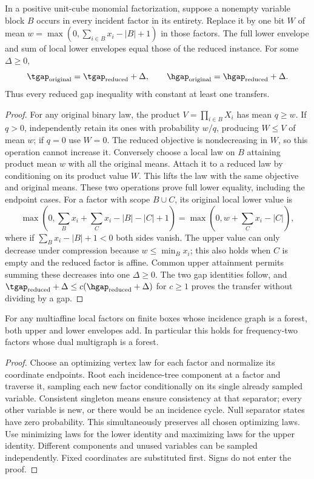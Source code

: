 \begin{lemma}\label{lem:twin-compression}
In a positive unit-cube monomial factorization, suppose a nonempty
variable block $B$ occurs in every incident factor in its entirety.
Replace it by one bit $W$ of mean
$w=\max(0,\sum_{i\in B}x_i-|B|+1)$ in those factors.
The full lower envelope and sum of local lower envelopes equal those
of the reduced instance. For some $\Delta\ge0$,
\[
 \tgap_{\rm original}=\tgap_{\rm reduced}+\Delta,\qquad
 \hgap_{\rm original}=\hgap_{\rm reduced}+\Delta.
\]
Thus every reduced gap inequality with constant at least one transfers.
\end{lemma}
\begin{proof}
For any original binary law, the product $V=\prod_{i\in B}X_i$ has
mean $q\ge w$. If $q>0$, independently retain its ones with probability
$w/q$, producing $W\le V$ of mean $w$; if $q=0$ use $W=0$.
The reduced objective is nondecreasing in $W$, so this operation cannot
increase it. Conversely choose a local law on $B$ attaining product
mean $w$ with all the original means. Attach it to a reduced law by
conditioning on its product value $W$. This lifts the law with the
same objective and original means. These two operations prove full
lower equality, including the endpoint cases.
For a factor with scope $B\cup C$, its original local lower value is
\[
 \max(0,\sum_Bx_i+\sum_Cx_i-|B|-|C|+1)
 =\max(0,w+\sum_Cx_i-|C|),
\]
where if $\sum_Bx_i-|B|+1<0$ both sides vanish. The upper value can
only decrease under compression because $w\le\min_Bx_i$; this also
holds when $C$ is empty and the reduced factor is affine.
Common upper attainment permits summing these decreases into one
$\Delta\ge0$. The two gap identities follow, and
$\tgap_{\rm reduced}+\Delta\le c(\hgap_{\rm reduced}+\Delta)$ for
$c\ge1$ proves the transfer without dividing by a gap.
\end{proof}

\begin{proposition}
\label{prop:signed-forest}
For any multiaffine local factors on finite boxes whose incidence graph
is a forest, both upper and lower envelopes add. In particular this
holds for frequency-two factors whose dual multigraph is a forest.
\end{proposition}
\begin{proof}
Choose an optimizing vertex law for each factor and normalize its
coordinate endpoints. Root each incidence-tree component at a factor
and traverse it, sampling each new factor conditionally on its single
already sampled variable. Consistent singleton means ensure consistency
at that separator; every other variable is new, or there would be an
incidence cycle. Null separator states have zero probability. This
simultaneously preserves all chosen optimizing laws. Use minimizing
laws for the lower identity and maximizing laws for the upper identity.
Different components and unused variables can be sampled independently.
Fixed coordinates are substituted first. Signs do not enter the proof.
\end{proof}

